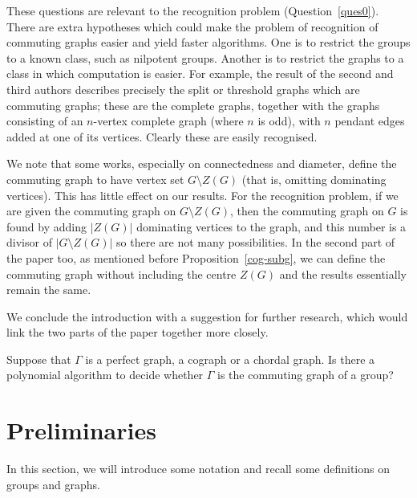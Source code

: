 \documentclass{elsarticle}
\begin{document}
These questions are relevant to the recognition problem
(Question~\ref{ques0}). There are extra hypotheses which could make
the problem of recognition of commuting graphs easier and yield faster
algorithms. One is to restrict the groups to a known class, such as
nilpotent groups. Another is to restrict the graphs to a class in
which computation is easier. For example, the result of the second and
third authors \cite{MaCam} describes precisely the split or threshold
graphs which are commuting graphs; these are the complete graphs,
together with the graphs consisting of an $n$-vertex complete graph
(where $n$ is odd), with $n$ pendant edges added at one of its
vertices. Clearly these are easily recognised.


We note that some works, especially on connectedness and diameter,
define the commuting graph to have vertex set $G\setminus Z(G)$ (that
is, omitting dominating vertices). This has little effect on our
results. For the recognition problem, if we are given the commuting
graph on $G\setminus Z(G)$, then the commuting graph on $G$ is found
by adding $|Z(G)|$ dominating vertices to the graph, and this number
is a divisor of $|G\setminus Z(G)|$ so there are not many
possibilities. In the second part of the paper too, as mentioned
before Proposition~\ref{cog-subg}, we can define the commuting graph
without including the centre $Z(G)$ and the results essentially remain
the same.

We conclude the introduction with a suggestion for further research,
which would link the two parts of the paper together more closely.

\begin{ques}
Suppose that $\Gamma$ is a perfect graph, a cograph or a chordal graph. Is
there a polynomial algorithm to decide whether $\Gamma$ is the commuting graph
of a group?
\end{ques}

\section{Preliminaries}\label{prelim-sec}
In this section, we will introduce some notation and recall some
definitions on groups and graphs.
\end{document}

